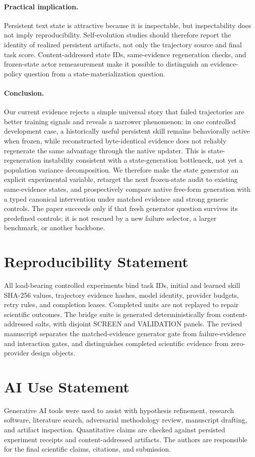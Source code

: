 \paragraph{Practical implication.}
Persistent text state is attractive because it is inspectable, but inspectability does not imply reproducibility. Self-evolution studies should therefore report the identity of realized persistent artifacts, not only the trajectory source and final task score. Content-addressed state IDs, same-evidence regeneration checks, and frozen-state actor remeasurement make it possible to distinguish an evidence-policy question from a state-materialization question.

\paragraph{Conclusion.}
Our current evidence rejects a simple universal story that failed trajectories are better training signals and reveals a narrower phenomenon: in one controlled development case, a historically useful persistent skill remains behaviorally active when frozen, while reconstructed byte-identical evidence does not reliably regenerate the same advantage through the native updater. This is state-regeneration instability consistent with a state-generation bottleneck, not yet a population variance decomposition. We therefore make the state generator an explicit experimental variable, retarget the next frozen-state audit to existing same-evidence states, and prospectively compare native free-form generation with a typed canonical intervention under matched evidence and strong generic controls. The paper succeeds only if that fresh generator question survives its predefined controls; it is not rescued by a new failure selector, a larger benchmark, or another backbone.

\section*{Reproducibility Statement}
All load-bearing controlled experiments bind task IDs, initial and learned skill SHA-256 values, trajectory evidence hashes, model identity, provider budgets, retry rules, and completion leases. Completed units are not replayed to repair scientific outcomes. The bridge suite is generated deterministically from content-addressed salts, with disjoint SCREEN and VALIDATION panels. The revised manuscript separates the matched-evidence generator gate from failure-evidence and interaction gates, and distinguishes completed scientific evidence from zero-provider design objects.

\section*{AI Use Statement}
Generative AI tools were used to assist with hypothesis refinement, research software, literature search, adversarial methodology review, manuscript drafting, and artifact inspection. Quantitative claims are checked against persisted experiment receipts and content-addressed artifacts. The authors are responsible for the final scientific claims, citations, and submission.
